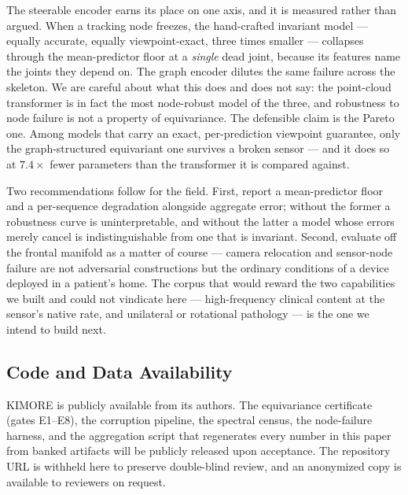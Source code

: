 \documentclass[10pt,journal]{IEEEtran}
\begin{document}
The steerable encoder earns its place on one axis, and it is measured rather than argued. When a tracking node freezes, the hand-crafted invariant model --- equally accurate, equally viewpoint-exact, three times smaller --- collapses through the mean-predictor floor at a \emph{single} dead joint, because its features name the joints they depend on. The graph encoder dilutes the same failure across the skeleton. We are careful about what this does and does not say: the point-cloud transformer is in fact the most node-robust model of the three, and robustness to node failure is not a property of equivariance. The defensible claim is the Pareto one. Among models that carry an exact, per-prediction viewpoint guarantee, only the graph-structured equivariant one survives a broken sensor --- and it does so at $7.4\times$ fewer parameters than the transformer it is compared against.

Two recommendations follow for the field. First, report a mean-predictor floor and a per-sequence degradation alongside aggregate error; without the former a robustness curve is uninterpretable, and without the latter a model whose errors merely cancel is indistinguishable from one that is invariant. Second, evaluate off the frontal manifold as a matter of course --- camera relocation and sensor-node failure are not adversarial constructions but the ordinary conditions of a device deployed in a patient's home. The corpus that would reward the two capabilities we built and could not vindicate here --- high-frequency clinical content at the sensor's native rate, and unilateral or rotational pathology --- is the one we intend to build next.

\subsection*{Code and Data Availability}
KIMORE \cite{capecci2019kimore} is publicly available from its authors. The equivariance certificate (gates E1--E8), the corruption pipeline, the spectral census, the node-failure harness, and the aggregation script that regenerates every number in this paper from banked artifacts will be publicly released upon acceptance. The repository URL is withheld here to preserve double-blind review, and an anonymized copy is available to reviewers on request.
\end{document}

